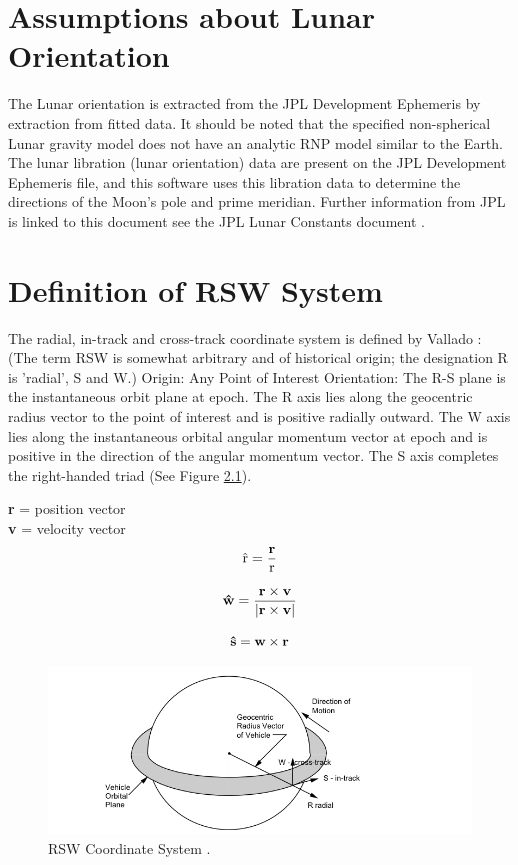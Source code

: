 \chapter{Assumptions about Lunar Orientation}\label{ap:moono}
The Lunar orientation is extracted from the JPL Development  Ephemeris by extraction from fitted data. It should be noted that the specified non-spherical Lunar gravity model does not have an analytic RNP model similar to the Earth. The lunar libration (lunar orientation) data are present on the JPL Development  Ephemeris file, and this software uses this libration data to determine the directions of the Moon's pole and prime meridian. Further information from JPL is linked to this document see the JPL Lunar Constants document \LUNARLINK .


\chapter{Definition of RSW System} \label{ap:rsw}
The radial, in-track and cross-track coordinate system is defined by Vallado \cite{VMcC}: (The term RSW is somewhat arbitrary and of historical origin; the designation R is 'radial', S and W.)
Origin:	Any Point of Interest
Orientation:	The R-S plane is the instantaneous orbit plane at epoch.
	The R axis lies along the geocentric radius vector to the point of interest and is positive radially outward.
	The W axis lies along the instantaneous orbital angular momentum vector at epoch and is positive in the direction of the  angular momentum vector.
	The S axis completes the right-handed triad (See Figure \ref{fig:7a}).



   {\bf{r}} = position vector  \\
   {\bf{v}} = velocity vector
\[
{\rm{\hat r}} = \frac{{\bf{r}}}{{\rm{r}}}
\]

\[
{\bf{\hat w}} = \frac{{{\bf{r}} \times {\bf{v}}}}{{\left| {{\bf{r}} \times {\bf{v}}} \right|}}
\]

\[
{\bf{\hat s}} = {\bf{w}} \times {\bf{r}}
\]

\begin{figure}[h!]
\includegraphics [width=7in]{figs/rsw.png}
\caption{RSW Coordinate System .}
\label{fig:7a}
\end{figure}

